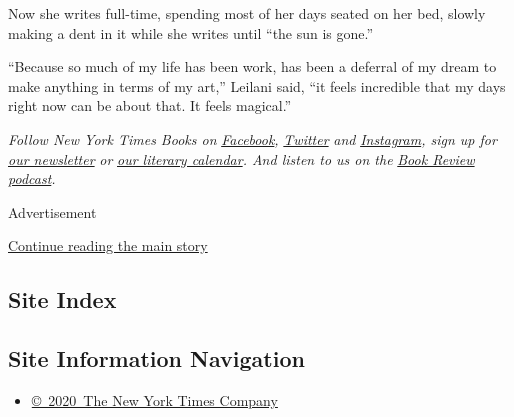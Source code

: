 Now she writes full-time, spending most of her days seated on her bed,
slowly making a dent in it while she writes until ``the sun is gone.''

``Because so much of my life has been work, has been a deferral of my
dream to make anything in terms of my art,'' Leilani said, ``it feels
incredible that my days right now can be about that. It feels magical.''

\emph{Follow New York Times Books on}
\href{https://www.facebookcorewwwi.onion/nytbooks/}{\emph{Facebook}}\emph{,}
\href{https://twitter.com/nytimesbooks}{\emph{Twitter}} \emph{and}
\href{https://www.instagram.com/nytbooks/}{\emph{Instagram}}\emph{, sign
up for}
\href{https://www.nytimes3xbfgragh.onion/newsletters/books-review}{\emph{our
newsletter}} \emph{or}
\href{https://www.nytimes3xbfgragh.onion/interactive/2017/books/books-calendar.html}{\emph{our
literary calendar}}\emph{. And listen to us on the}
\href{https://www.nytimes3xbfgragh.onion/column/book-review-podcast}{\emph{Book
Review podcast}}\emph{.}

Advertisement

\protect\hyperlink{after-bottom}{Continue reading the main story}

\hypertarget{site-index}{%
\subsection{Site Index}\label{site-index}}

\hypertarget{site-information-navigation}{%
\subsection{Site Information
Navigation}\label{site-information-navigation}}

\begin{itemize}
\tightlist
\item
  \href{https://help.nytimes3xbfgragh.onion/hc/en-us/articles/115014792127-Copyright-notice}{©~2020~The
  New York Times Company}
\end{itemize}

